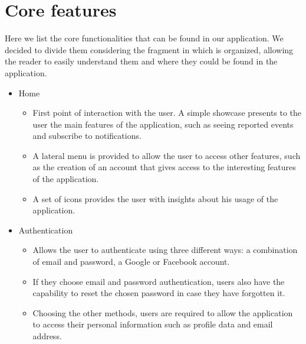 \documentclass[a4paper]{scrreprt}
\begin{document}
\section{Core features}
Here we list the core functionalities that can be found in our application. We decided to divide them considering the fragment in which is organized, allowing the reader to easily understand them and where they could be found in the application.
\begin{itemize}
\item Home
\begin{itemize}
\item First point of interaction with the user. A simple showcase presents to the user the main features of the application, such as seeing reported events and subscribe to notifications.
\item A lateral menu is provided to allow the user to access other features, such as the creation of an account that gives access to the interesting features of the application.
\item A set of icons provides the user with insights about his usage of the application.
\end{itemize}

\item Authentication
\begin{itemize}
\item Allows the user to authenticate using three different ways: a combination of email and password, a Google or Facebook account.
\item If they choose email and password authentication, users also have the capability to reset the chosen password in case they have forgotten it.
\item Choosing the other methods, users are required to allow the application to access their personal information such as profile data and email address.
\end{itemize}


\end{itemize}
\end{document}
